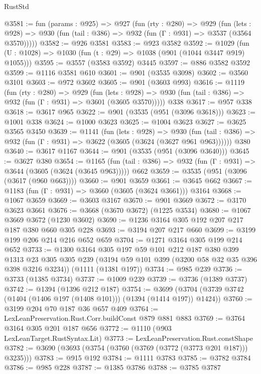 \begin{lexlean}{RustStd}
\begin{coremodule}
@3581 := fun (params : @925) =>
  @927
    (fun (rty : @280) =>
    @929
      (fun (lets : @928) =>
      @930 (fun (tail : @386) => @932 (fun (Γ : @931) => @3537 (@3564 @3570)))))
@3582 := @926 @3581
@3583 := @923 @3582
@3592 := @1029 (fun (U : @1028) => @1030 (fun (t : @29) => @1038 (@901 (@1044 @3447 @919) @1055)))
@3595 := @3557 (@3583 @3592) @3445
@3597 := @886 @3582 @3592
@3599 := @1116 @3581 @610
@3601 := @901 (@3535 @3098)
@3602 := @3560 @3101
@3603 := @972 @3602
@3605 := @901 (@3603 @993)
@3616 := @1119
    (fun (rty : @280) =>
    @929
      (fun (lets : @928) =>
      @930 (fun (tail : @386) => @932 (fun (Γ : @931) => @3601 (@3605 @3570)))))
    @338
@3617 := @957 @338
@3618 := @3617 @965
@3622 := @901 (@3535 (@951 (@3096 @3618)))
@3623 := @1001 @338
@3624 := @1000 @3623
@3625 := @1004 @3623
@3627 := @3625 @3565 @3450
@3639 := @1141
    (fun (lets : @928) =>
    @930 (fun (tail : @386) => @932 (fun (Γ : @931) => @3622 (@3605 (@3624 (@3627 @961 @963))))))
    @380
@3640 := @3617 @1167
@3644 := @901 (@3535 (@951 (@3096 @3640)))
@3645 := @3627 @380
@3654 := @1165
    (fun (tail : @386) => @932 (fun (Γ : @931) => @3644 (@3605 (@3624 (@3645 @963)))))
    @662
@3659 := @3535 (@951 (@3096 (@3617 (@960 @663))))
@3660 := @901 @3659
@3661 := @3645 @662
@3667 := @1183 (fun (Γ : @931) => @3660 (@3605 (@3624 @3661))) @3164
@3668 := @1067 @3659
@3669 := @3603 @3167
@3670 := @901 @3669
@3672 := @3170 @3623 @3661
@3676 := @3668 (@3670 @3672) (@1225 @3534)
@3680 := @1067 @3669 @3672 (@1230 @3602)
@3690 := @1236 @3164 @305 @192 @207 @217 @187 @380 @660 @305 @228
@3693 := @3194 @207 @217 @660
@3699 := @3199 @199 @206 @214 @216 @652 @659
@3704 := @1271 @3164 @305 @199 @214 @652
@3733 := @1300
    @3164
    @305
    @197
    @59
    @101
    @212
    @187
    @380
    @399
    @1313
    @23
    @305
    @305
    @239
    (@3194 @59 @101 @399 (@3200 @58 @32 @35 @396 @398 @3216 @3234))
    (@1111 (@1381 @197))
@3734 := @985 @239
@3736 := @3733 (@1385 @3734)
@3737 := @1009 @239
@3739 := @3736 (@1389 @3737)
@3742 := @1394 (@1396 @212 @187)
@3754 := @3699 (@3704 (@3739 @3742 (@1404 (@1406 @197 (@1408 @101))) (@1394 (@1414 @197)) @1424))
@3760 := @3199 @204 @70 @187 @36 @657 @409
@3764 := LexLeanPreservation.Rust.Corr.buildConst @879 @881 @883
@3769 := @3764 @3164 @305 @201 @187 @656
@3772 := @1110 (@903 LexLeanTarget.RustSyntax.Lit)
@3773 := LexLeanPreservation.Rust.constShape
@3782 := @3690 (@3693 (@3754 (@3760 (@3769 (@3772 (@3773 @201 @187))) @3235)))
@3783 := @915 @192
@3784 := @1111 @3783
@3785 := @3782 @3784
@3786 := @985 @228
@3787 := @1385 @3786
@3788 := @3785 @3787

\end{coremodule}
\end{lexlean}
